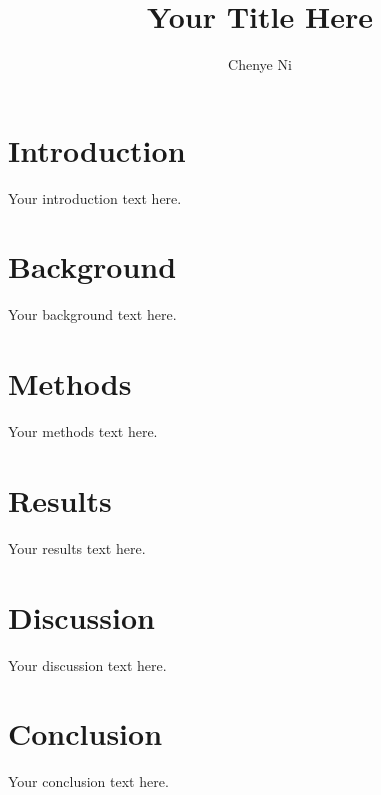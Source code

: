 \documentclass[sigconf]{acmart}
\begin{document}
\title{Your Title Here}

\author{Chenye Ni}

\maketitle

\section{Introduction}

Your introduction text here.

\section{Background}

Your background text here.

\section{Methods}

Your methods text here.

\section{Results}

Your results text here.

\section{Discussion}

Your discussion text here.

\section{Conclusion}

Your conclusion text here.



\end{document}
